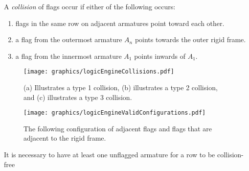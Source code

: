 A \textit{collision} of flags occur if either of the following occurs:
\begin{enumerate}
\item flags in the same row on adjacent armatures point toward each other.
\item a flag from the outermost armature $A_n$ points towards the outer rigid frame.
\item a flag from the innermost armature $A_1$ points inwards of $A_1$.
\end{enumerate}
\begin{figure}[!htbp]
\begin{center}
\texttt{[image: graphics/logicEngineCollisions.pdf]}
\caption{(a) Illustrates a type 1 collision, (b) illustrates a type 2 collision, and (c) 
illustrates a type 3 collision.}\label{fig:logicEngineCollisions.pdf}
\end{center}

\end{figure}
\begin{figure}[!htbp]
\begin{center}
\texttt{[image: graphics/logicEngineValidConfigurations.pdf]}
\caption{The following configuration of adjacent flags 
and flags that are adjacent to the rigid frame.}\label{fig:logicEngineValidConfigurations.pdf}
\end{center}
\end{figure}
\begin{lem}It is necessary to have at least one unflagged armature for a row to be collision-free \end{lem}


